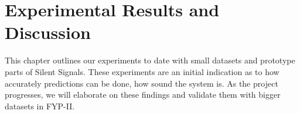 \documentclass{FastFyp}
\begin{document}



\chapter{Experimental Results and Discussion}
This chapter outlines our experiments to date with small datasets and prototype parts of Silent Signals. These experiments are an initial indication as to how accurately predictions can be done, how sound the system is. As the project progresses, we will elaborate on these findings and validate them with bigger datasets in FYP-II.
\end{document}
